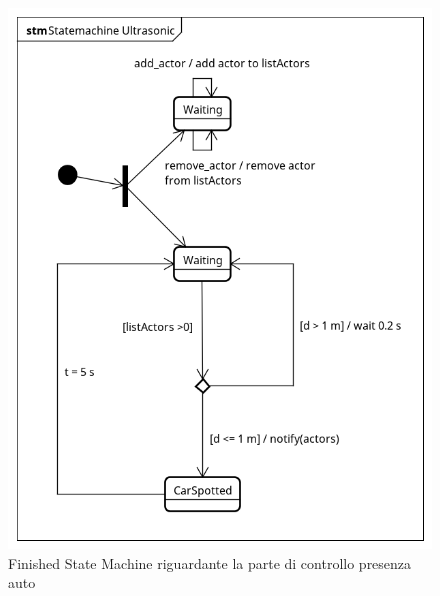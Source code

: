 \begin{figure}[tbp]
	\centering
	\includegraphics[scale=.75]{figure/Statemachine_Ultrasonic.png}
	\caption{Finished State Machine riguardante la parte di controllo presenza auto \label{FSM CAR}}
\end{figure}
\newpage
